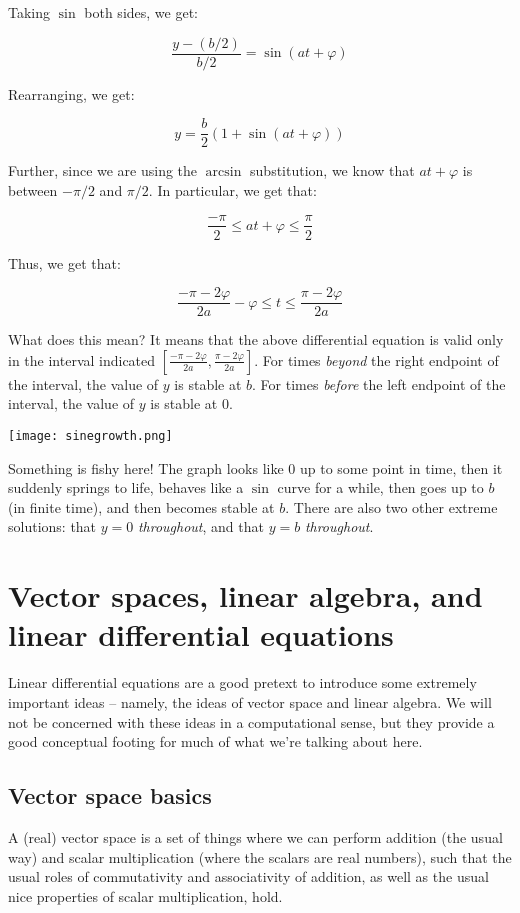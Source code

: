 \documentclass{amsart}
\begin{document}
Taking $\sin$ both sides, we get:

$$\frac{y - (b/2)}{b/2} = \sin(at + \varphi)$$

Rearranging, we get:

$$y = \frac{b}{2}\left(1 + \sin(at + \varphi)\right)$$

Further, since we are using the $\arcsin$ substitution, we know that
$at + \varphi$ is between $-\pi/2$ and $\pi/2$. In particular, we get
that:

$$\frac{-\pi}{2} \le at + \varphi \le \frac{\pi}{2}$$

Thus, we get that:

$$\frac{-\pi - 2\varphi}{2a} - \varphi \le t \le \frac{\pi - 2\varphi}{2a}$$

What does this mean? It means that the above differential equation is
valid only in the interval indicated $\left[\frac{-\pi -
2\varphi}{2a},\frac{\pi - 2\varphi}{2a}\right]$. For times {\em
beyond} the right endpoint of the interval, the value of $y$ is stable
at $b$. For times {\em before} the left endpoint of the interval, the
value of $y$ is stable at $0$.

\texttt{[image: sinegrowth.png]}

Something is fishy here! The graph looks like $0$ up to some point in
time, then it suddenly springs to life, behaves like a $\sin$ curve
for a while, then goes up to $b$ (in finite time), and then becomes
stable at $b$. There are also two other extreme solutions: that $y =
0$ {\em throughout}, and that $y = b$ {\em throughout}.

\section{Vector spaces, linear algebra, and linear differential equations}

Linear differential equations are a good pretext to introduce some
extremely important ideas -- namely, the ideas of vector space and
linear algebra. We will not be concerned with these ideas in a
computational sense, but they provide a good conceptual footing for
much of what we're talking about here.

\subsection{Vector space basics}

A (real) vector space is a set of things where we can perform addition
(the usual way) and scalar multiplication (where the scalars are real
numbers), such that the usual roles of commutativity and associativity
of addition, as well as the usual nice properties of scalar
multiplication, hold.
\end{document}
